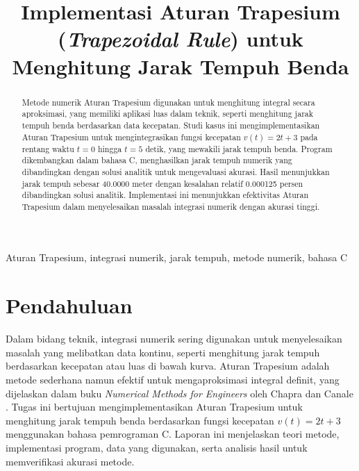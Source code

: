 \documentclass[conference]{IEEEtran}
\begin{document}
\title{Implementasi Aturan Trapesium (\textit{Trapezoidal Rule}) untuk Menghitung Jarak Tempuh Benda}

\author{
\and
{}
}

\maketitle

\begin{abstract}
Metode numerik Aturan Trapesium digunakan untuk menghitung integral secara aproksimasi, yang memiliki aplikasi luas dalam teknik, seperti menghitung jarak tempuh benda berdasarkan data kecepatan. Studi kasus ini mengimplementasikan Aturan Trapesium untuk mengintegrasikan fungsi kecepatan \( v(t) = 2t + 3 \) pada rentang waktu \( t = 0 \) hingga \( t = 5 \) detik, yang mewakili jarak tempuh benda. Program dikembangkan dalam bahasa C, menghasilkan jarak tempuh numerik yang dibandingkan dengan solusi analitik untuk mengevaluasi akurasi. Hasil menunjukkan jarak tempuh sebesar 40.0000 meter dengan kesalahan relatif 0.000125 persen dibandingkan solusi analitik. Implementasi ini menunjukkan efektivitas Aturan Trapesium dalam menyelesaikan masalah integrasi numerik dengan akurasi tinggi.
\end{abstract}

\begin{IEEEkeywords}
Aturan Trapesium, integrasi numerik, jarak tempuh, metode numerik, bahasa C
\end{IEEEkeywords}

\section{Pendahuluan}
Dalam bidang teknik, integrasi numerik sering digunakan untuk menyelesaikan masalah yang melibatkan data kontinu, seperti menghitung jarak tempuh berdasarkan kecepatan atau luas di bawah kurva. Aturan Trapesium adalah metode sederhana namun efektif untuk mengaproksimasi integral definit, yang dijelaskan dalam buku \textit{Numerical Methods for Engineers} oleh Chapra dan Canale \cite{b1}. Tugas ini bertujuan mengimplementasikan Aturan Trapesium untuk menghitung jarak tempuh benda berdasarkan fungsi kecepatan \( v(t) = 2t + 3 \) menggunakan bahasa pemrograman C. Laporan ini menjelaskan teori metode, implementasi program, data yang digunakan, serta analisis hasil untuk memverifikasi akurasi metode.
\end{document}
